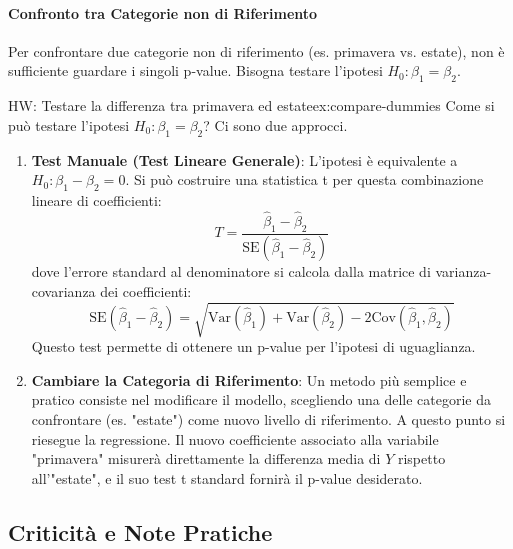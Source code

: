 \paragraph{Confronto tra Categorie non di Riferimento}
Per confrontare due categorie non di riferimento (es. primavera vs. estate), non
è sufficiente guardare i singoli p-value. Bisogna testare l'ipotesi \(H_0:
\beta_1 = \beta_2\).

\begin{esercizio}{HW: Testare la differenza tra primavera ed
estate}{ex:compare-dummies}
Come si può testare l'ipotesi \(H_0: \beta_1 = \beta_2\)? Ci sono due approcci.
\begin{dimostrazione}{}{}
\begin{enumerate}
    \item \textbf{Test Manuale (Test Lineare Generale)}: L'ipotesi è
    equivalente a \(H_0: \beta_1 - \beta_2 = 0\). Si può costruire una
    statistica t per questa combinazione lineare di coefficienti:
    \[ T = \frac{\hat{\beta}_1 - \hat{\beta}_2}{\text{SE}(\hat{\beta}_1 -
    \hat{\beta}_2)} \]
    dove l'errore standard al denominatore si calcola dalla matrice di
    varianza-covarianza dei coefficienti:
    \[ \text{SE}(\hat{\beta}_1 - \hat{\beta}_2) =
    \sqrt{\text{Var}(\hat{\beta}_1) + \text{Var}(\hat{\beta}_2) -
    2\text{Cov}(\hat{\beta}_1, \hat{\beta}_2)} \]
    Questo test permette di ottenere un p-value per l'ipotesi di uguaglianza.

    \item \textbf{Cambiare la Categoria di Riferimento}: Un metodo più semplice
    e pratico consiste nel modificare il modello, scegliendo una delle categorie
    da confrontare (es. "estate") come nuovo livello di riferimento. A questo
    punto si riesegue la regressione. Il nuovo coefficiente associato alla
    variabile "primavera" misurerà direttamente la differenza media di \(Y\)
    rispetto all'"estate", e il suo test t standard fornirà il p-value
    desiderato.
\end{enumerate}
\end{dimostrazione}
\end{esercizio}

\subsection{Criticità e Note Pratiche}

